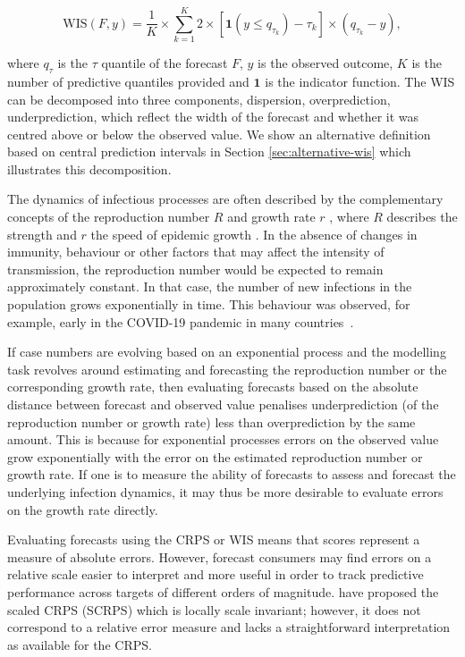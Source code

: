 \documentclass{article}
\begin{document}
\begin{linenomath*}
\begin{equation*}
    \text{WIS}(F, y) = \frac{1}{K} \times \sum_{k = 1}^{K} 2 \times \left[ \boldsymbol{1}(y \leq q_{\tau_k}) - \tau_k \right] \times ( q_{\tau_k} - y), 
\end{equation*}
\end{linenomath*}
where $q_{\tau}$ is the $\tau$ quantile of the forecast $F$, $y$ is the observed outcome, $K$ is the number of predictive quantiles provided and $\boldsymbol{1}$ is the indicator function. The WIS can be decomposed into three components, dispersion, overprediction, underprediction, which reflect the width of the forecast and whether it was centred above or below the observed value. We show an alternative definition based on central prediction intervals in Section \ref{sec:alternative-wis} which illustrates this decomposition. 

The dynamics of infectious processes are often described by the complementary concepts of the reproduction number $R$ \citep{gosticPracticalConsiderationsMeasuring2020} and growth rate $r$ \citep{wallingaHowGenerationIntervals2007}, where $R$ describes the strength and $r$ the speed of epidemic growth \citep{dushoffSpeedStrengthEpidemic2021}.
In the absence of changes in immunity, behaviour or other factors that may affect the intensity of transmission, the reproduction number would be expected to remain approximately constant.
In that case, the number of new infections in the population grows exponentially in time.
This behaviour was observed, for example, early in the COVID-19 pandemic in many countries~\citep{pellisChallengesControlCOVID192021}.

If case numbers are evolving based on an exponential process and the  modelling task revolves around estimating and forecasting the reproduction number or the corresponding growth rate, then evaluating forecasts based on the absolute distance between forecast and observed value penalises underprediction (of the reproduction number or growth rate) less than overprediction by the same amount. This is because for exponential processes errors on the observed value grow exponentially with the error on the estimated reproduction number or growth rate. 
If one is to measure the ability of forecasts to assess and forecast the underlying infection dynamics, it may thus be more desirable to evaluate errors on the growth rate directly.

Evaluating forecasts using the CRPS or WIS means that scores represent a measure of absolute errors. However, forecast consumers may find errors on a relative scale easier to interpret and more useful in order to track predictive performance across targets of different orders of magnitude. 
\cite{bolinLocalScaleInvariance2021} have proposed the scaled CRPS (SCRPS) which is locally scale invariant; however, it does not correspond to a relative error measure and lacks a straightforward interpretation as available for the CRPS. 
\end{document}
